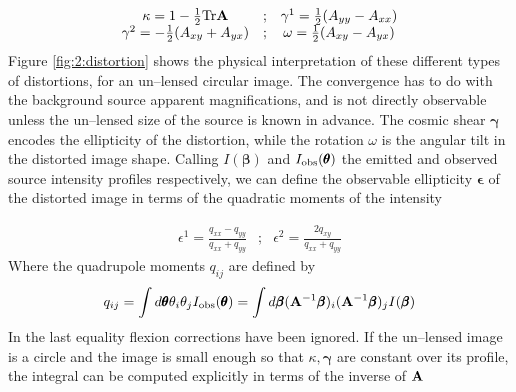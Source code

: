 \begin{equation}
\label{eq:2:dfl-inverse}
\begin{matrix}
\kappa = 1-\frac{1}{2}{\rm Tr} \mathbf{A} & ; & \gamma^1 = \frac{1}{2}(A_{yy} - A_{xx}) \\
\gamma^2 = -\frac{1}{2}(A_{xy}+A_{yx}) & ; & \omega = \frac{1}{2}(A_{xy} - A_{yx})
\end{matrix}
\end{equation}
% 
Figure \ref{fig:2:distortion} shows the physical interpretation of these different types of distortions, for an un--lensed circular image. The convergence has to do with the background source apparent magnifications, and is not directly observable unless the un--lensed size of the source is known in advance. The cosmic shear $\pmb{\gamma}$ encodes the ellipticity of the distortion, while the rotation $\omega$ is the angular tilt in the distorted image shape. Calling $I(\pmb{\beta})$ and $I_{\rm obs}(\pmb{\theta})$ the emitted and observed source intensity profiles respectively, we can define the observable ellipticity $\pmb{\epsilon}$ of the distorted image in terms of the quadratic moments of the intensity 

\begin{equation}
\label{eq:2:ellipticity-1}
\begin{matrix}
\epsilon^1 = \frac{q_{xx}-q_{yy}}{q_{xx}+q_{yy}} & ; & \epsilon^2 = \frac{2q_{xy}}{q_{xx}+q_{yy}}
\end{matrix}
\end{equation} 
%
Where the quadrupole moments $q_{ij}$ are defined by 
\begin{equation}
\label{eq:2:quadrupole}
q_{ij} = \int d\pmb{\theta} \theta_i\theta_j I_{\rm obs}(\pmb{\theta}) = \int d\pmb{\beta} (\mathbf{A}^{-1}\pmb{\beta})_i(\mathbf{A}^{-1}\pmb{\beta})_j I(\pmb{\beta})
\end{equation}
%
In the last equality flexion corrections have been ignored. If the un--lensed image is a circle and the image is small enough so that $\kappa,\pmb{\gamma}$ are constant over its profile, the integral can be computed explicitly in terms of the inverse of $\mathbf{A}$

